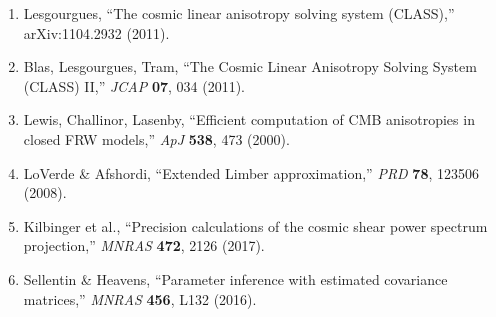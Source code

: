 \documentclass[11pt,a4paper]{article}
\begin{document}
\begin{enumerate}
\item Lesgourgues, ``The cosmic linear anisotropy solving system (CLASS),'' arXiv:1104.2932 (2011).
\item Blas, Lesgourgues, Tram, ``The Cosmic Linear Anisotropy Solving System (CLASS) II,'' \textit{JCAP} \textbf{07}, 034 (2011).
\item Lewis, Challinor, Lasenby, ``Efficient computation of CMB anisotropies in closed FRW models,'' \textit{ApJ} \textbf{538}, 473 (2000).
\item LoVerde \& Afshordi, ``Extended Limber approximation,'' \textit{PRD} \textbf{78}, 123506 (2008).
\item Kilbinger et al., ``Precision calculations of the cosmic shear power spectrum projection,'' \textit{MNRAS} \textbf{472}, 2126 (2017).
\item Sellentin \& Heavens, ``Parameter inference with estimated covariance matrices,'' \textit{MNRAS} \textbf{456}, L132 (2016).
\end{enumerate}
\end{document}
